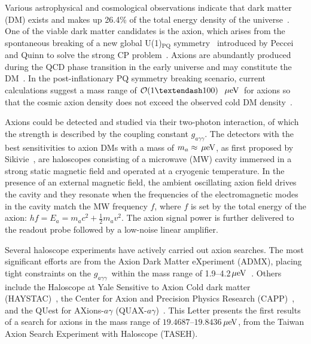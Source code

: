 \documentclass[%
 reprint,prl, %
superscriptaddress,
nobibnotes,
 amsmath,amssymb,
 aps,
]{revtex4-2}
\newcommand{\bgagg}{\ensuremath{g_{a\gamma\gamma}}}
\newcommand{\ma}{\ensuremath{m_a}}
\newcommand{\muevcc}{\ensuremath{\,\mu\text{e\hspace{-.08em}V}}}
\newcommand{\mlo}{\ensuremath{19.4687}}
\newcommand{\mhi}{\ensuremath{19.8436}}
\begin{document}
Various astrophysical and cosmological observations indicate that dark matter 
(DM) exists and makes up 26.4\% of the total energy density of the 
universe~\cite{DMI,DMII,DMIII,DMIV,PDG}. One of the viable dark matter 
candidates is the axion, which arises from the spontaneous breaking of a new 
global U(1)$_\mathrm{PQ}$ symmetry~\cite{strongCPI}  
introduced by Peccei and Quinn to solve the strong CP 
problem~\cite{strongCPI,strongCPII,strongCPIII}. 
Axions are abundantly produced during the QCD phase transition in 
the early universe and may constitute the 
DM~\cite{ADDONI,ADDONII,ADDONIII,ADDONIV}. 
In the post-inflationary PQ symmetry breaking scenario, 
current calculations suggest a mass range of 
${\cal O}(1–100)$~\muevcc\ for axions so that the cosmic axion density does 
not exceed the 
observed cold DM density~\cite{QCDCalI,QCDCalII,QCDCalIII,QCDCalIV,QCDCalV,QCDCalVI,QCDCalVII,QCDCalVIII,QCDCalIX,QCDCalX,QCDCalXI,QCDCalXII,QCDCalXIII}. 
%

Axions could be detected and studied via their two-photon interaction, 
of which the strength is described by the coupling constant \bgagg. 
The detectors with the best sensitivities to axion DMs with a mass of 
$\ma\approx \muevcc$, as first proposed by 
Sikivie~\cite{SikivieI,SikivieII}, are haloscopes consisting of a microwave 
(MW) cavity immersed in a strong static 
magnetic field and operated at a cryogenic temperature. 
In the presence of an external magnetic field, the ambient oscillating axion 
field drives the cavity and they resonate when the frequencies of the 
electromagnetic 
modes in the cavity match the MW frequency $f$, where $f$ is set by 
the total energy of the axion: $hf=E_a=\ma c^2 + \frac{1}{2}\ma v^2$. The 
axion signal power is further delivered 
to the readout probe followed by a low-noise linear amplifier. 

Several haloscope experiments have actively carried out axion searches. 
The most significant efforts are from the Axion Dark Matter 
eXperiment (ADMX), placing tight constraints on the \bgagg\ 
within the mass range of 
1.9--4.2\muevcc~\cite{ADMXI,ADMXII,ADMXIII,ADMXIV,ADMXV,ADMXVI,ADMXVII}. 
Others include the Haloscope at Yale Sensitive to Axion Cold dark matter 
(HAYSTAC)~\cite{HAYSTACIII,HAYSTACIV,HAYSTACI}, the Center 
for Axion and Precision Physics Research (CAPP)~\cite{CAPPII,CAPPIII,CAPPI}, 
and the QUest for AXions-$a\gamma$ (QUAX-$a\gamma$)~\cite{QUAX}. 
%
This Letter presents the first results 
of a search for axions in the mass range of \mlo--\mhi\muevcc, 
from the Taiwan Axion Search Experiment with Haloscope (TASEH). 
\end{document}
